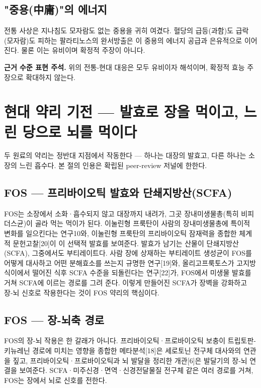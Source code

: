 \documentclass[12pt,oneside]{book}
\newenvironment{authnote}
  {\par\smallskip\begingroup\leftskip=6mm\rightskip=3mm\small\color{muted}\noindent\ignorespaces}
  {\par\endgroup\smallskip}
\begin{document}
\subsection{"중용(中庸)"의 에너지}

전통 사상은 지나침도 모자람도 없는 중용을 귀히 여겼다. 혈당의 급등(과함)도 급락(모자람)도 피하는 팔라티노스의 완서방출은 이 중용의 에너지 공급과 은유적으로 이어진다. 물론 이는 유비이며 확정적 주장이 아니다.

\begin{authnote}\textbf{근거 수준 표현 주석.} 위의 전통-현대 대응은 모두 유비이자 해석이며, 확정적 효능 주장으로 확대하지 않는다.\end{authnote}

\section{현대 약리 기전 — 발효로 장을 먹이고, 느린 당으로 뇌를 먹이다}

두 원료의 약리는 정반대 지점에서 작동한다 — 하나는 대장의 발효고, 다른 하나는 소장의 느린 흡수다. 본 절의 인용은 확립된 peer-review 저널에 한한다.

\subsection{FOS — 프리바이오틱 발효와 단쇄지방산(SCFA)}

FOS는 소장에서 소화·흡수되지 않고 대장까지 내려가, 그곳 장내미생물총(특히 비피더스균)이 골라 먹는 먹이가 된다. 이눌린형 프룩탄이 사람의 장내미생물총에 특이적 변화를 일으킨다는 연구10와, 이눌린형 프룩탄의 프리바이오틱 잠재력을 종합한 체계적 문헌고찰[20]이 이 선택적 발효를 보여준다. 발효가 남기는 산물이 단쇄지방산(SCFA), 그중에서도 부티레이트다. 사람 장에 상재하는 부티레이트 생성균이 FOS를 어떻게 대사하고 어떤 분해효소를 쓰는지 규명한 연구[19]와, 올리고프룩토스가 고지방 식이에서 떨어진 식후 SCFA 수준을 되돌린다는 연구[22]가, FOS에서 미생물 발효를 거쳐 SCFA에 이르는 경로를 그려 준다. 이렇게 만들어진 SCFA가 장벽을 강화하고 장-뇌 신호로 작용한다는 것이 FOS 약리의 핵심이다.

\subsection{FOS — 장-뇌축 경로}

FOS의 장-뇌 작용은 한 갈래가 아니다. 프리바이오틱·프로바이오틱 보충이 트립토판-키뉴레닌 경로에 미치는 영향을 종합한 메타분석[18]은 세로토닌 전구체 대사와의 연관을 짚고, 프리바이오틱·프로바이오틱과 뇌 발달을 정리한 개관[6]은 발달기의 장-뇌 연결을 보여준다. SCFA·미주신경·면역·신경전달물질 전구체 같은 여러 경로를 거쳐, FOS는 장에서 뇌로 신호를 전한다.
\end{document}

